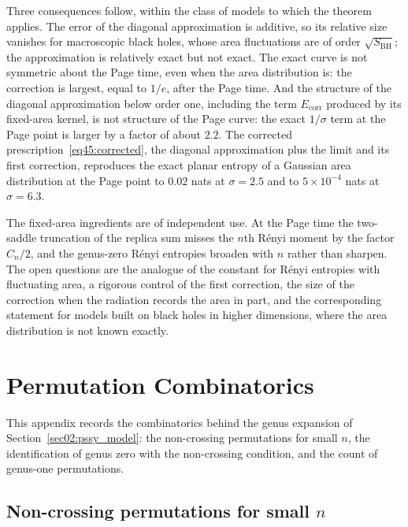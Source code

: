 \documentclass[11pt,letterpaper]{article}
\theoremstyle{plain}
\theoremstyle{definition}
\theoremstyle{remark}
\begin{document}
Three consequences follow, within the class of models to which the theorem applies. The error of the diagonal approximation is additive, so its relative size vanishes for macroscopic black holes, whose area fluctuations are of order $\sqrt{S_{\mathrm{BH}}}$; the approximation is relatively exact but not exact. The exact curve is not symmetric about the Page time, even when the area distribution is: the correction is largest, equal to $1/e$, after the Page time. And the structure of the diagonal approximation below order one, including the term $E_{\mathrm{corr}}$ produced by its fixed-area kernel, is not structure of the Page curve: the exact $1/\sigma$ term at the Page point is larger by a factor of about $2.2$. The corrected prescription~\eqref{eq45:corrected}, the diagonal approximation plus the limit and its first correction, reproduces the exact planar entropy of a Gaussian area distribution at the Page point to $0.02$ nats at $\sigma = 2.5$ and to $5\times10^{-4}$ nats at $\sigma = 6.3$.

The fixed-area ingredients are of independent use. At the Page time the two-saddle truncation of the replica sum misses the $n$th R\'enyi moment by the factor $C_n/2$, and the genus-zero R\'enyi entropies broaden with $n$ rather than sharpen. The open questions are the analogue of the constant for R\'enyi entropies with fluctuating area, a rigorous control of the first correction, the size of the correction when the radiation records the area in part, and the corresponding statement for models built on black holes in higher dimensions, where the area distribution is not known exactly.


\appendix


\section{Permutation Combinatorics}
\label{app:permutation_combinatorics}

This appendix records the combinatorics behind the genus expansion of Section~\ref{sec02:pssy_model}: the non-crossing permutations for small $n$, the identification of genus zero with the non-crossing condition, and the count of genus-one permutations.

\subsection{Non-crossing permutations for small \texorpdfstring{$n$}{n}}
\label{subsecA:enumeration}
\end{document}
